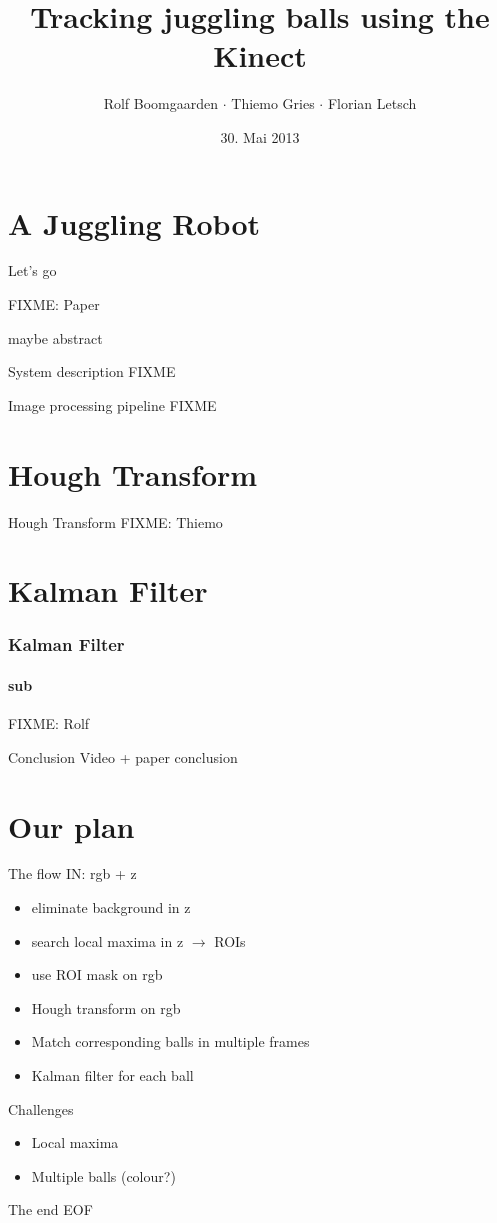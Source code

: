 \documentclass{beamer}
\title{Tracking juggling balls using the Kinect}
\author[Rolf $\cdot$ Thiemo $\cdot$ Flo]{Rolf Boomgaarden $\cdot$ Thiemo Gries $\cdot$ Florian Letsch}
\institute{Universität Hamburg}
\date{30. Mai 2013}
\begin{document}
\frame
{
\titlepage
}

\frame
{
\tableofcontents
}

\section{A Juggling Robot}

\begin{frame}{Let's go}

FIXME: Paper 

maybe abstract
   
\end{frame}

\begin{frame}{System description}
FIXME
\end{frame}

\begin{frame}{Image processing pipeline}
FIXME
\end{frame}


\section{Hough Transform}

\begin{frame}{Hough Transform}
   FIXME: Thiemo
\end{frame}

\section{Kalman Filter}

\begin{frame}
\frametitle{Kalman Filter}
\framesubtitle{sub}

FIXME: Rolf

\end{frame}

\begin{frame}{Conclusion}
   Video + paper conclusion
\end{frame}

\section{Our plan}
\begin{frame}{The flow}
IN: rgb + z

\begin{itemize}
	\item eliminate background in z
	\item search local maxima in z $\rightarrow$ ROIs
	\item use ROI mask on rgb
	\item Hough transform on rgb
	\item Match corresponding balls in multiple frames
	\item Kalman filter for each ball
\end{itemize}
\end{frame}

\begin{frame}{Challenges}
\begin{itemize}
	\item Local maxima
	\item Multiple balls (colour?)
\end{itemize}
\end{frame}

\begin{frame}{The end}
EOF
\end{frame}
\end{document}
